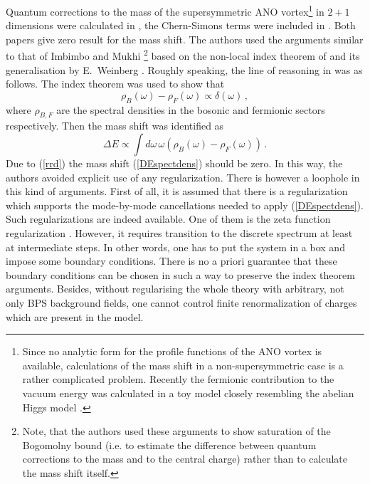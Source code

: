 \documentclass[a4paper,12pt]{article}
\begin{document}
Quantum corrections to the mass of the supersymmetric ANO vortex\footnote{
Since no analytic form for the profile functions of the ANO vortex is
available, calculations of the mass shift in a non-supersymmetric case
is a rather complicated problem. Recently the fermionic contribution
to the vacuum energy was calculated in a toy model closely resembling 
the abelian Higgs model \cite{BorDro}.} in $2+1$
dimensions were calculated in \cite{Schmidt:cu}, the Chern-Simons terms
were included in \cite{Lee:1994pm}. Both papers \cite{Schmidt:cu,Lee:1994pm}
give zero result for the mass shift. The authors used the arguments 
similar to that of Imbimbo and Mukhi \cite{Imbimbo:1984nq}\footnote{Note, 
that the authors \cite{Imbimbo:1984nq}
used these arguments to show saturation of the
Bogomolny bound (i.e. to estimate the difference between quantum corrections
to the mass and to the central charge) rather than to calculate the mass shift
itself.}
based on the non-local index
theorem of \cite{Callias:1977kg}
and its generalisation by E.~Weinberg \cite{Weinberg:er}.
Roughly speaking, the line of reasoning in \cite{Schmidt:cu,Lee:1994pm}
was as follows. The index theorem was used to show that
\begin{equation}
\rho_B(\omega ) - \rho_F(\omega )\propto \delta (\omega ) \,,
\label{rrd}
\end{equation}
where $\rho_{B,F}$ are the spectral densities in the bosonic and fermionic
sectors respectively. Then the mass shift was identified as
\begin{equation}
\Delta E\propto \int d\omega\, \omega (\rho_B(\omega ) - \rho_F(\omega ))
\,.\label{DEspectdens}
\end{equation}
Due to (\ref{rrd}) the mass shift (\ref{DEspectdens}) should be zero.
In this way, the authors \cite{Schmidt:cu,Lee:1994pm} avoided explicit use
of any regularization. There is however a loophole in this kind of
arguments. First of all, it is assumed that there is a regularization
which supports the mode-by-mode cancellations needed to apply 
(\ref{DEspectdens}). Such regularizations are indeed available.
One of them is the zeta function regularization \cite{zfun}.
However, it requires transition to the discrete spectrum
at least at intermediate
steps. In other words, one has to put the system in a box and
impose some boundary conditions. There is no a priori guarantee that
these boundary conditions can be chosen in such a way to preserve
the index theorem arguments. Besides, without regularising the whole
theory with arbitrary, not only BPS background fields, one cannot
control finite renormalization of charges which are present in the
model.
\end{document}
